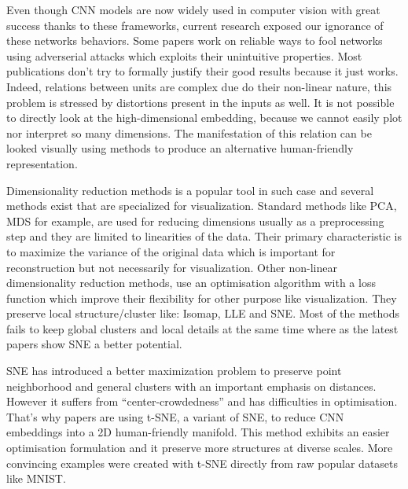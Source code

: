 \documentclass[a4paper,12pt]{report}
\begin{document}
Even though CNN models are now widely used in computer vision with great success thanks to these frameworks, current research exposed our ignorance of these networks behaviors.
Some papers work on reliable ways to fool networks using adverserial attacks which exploits their unintuitive properties\cite{szegedy2013intriguing}.
Most publications don't try to formally justify their good results because it just works. %
Indeed, relations between units are complex due do their non-linear nature, this problem is stressed by distortions present in the inputs as well.
It is not possible to directly look at the high-dimensional embedding, because we cannot easily plot nor interpret so many dimensions.
The manifestation of this relation can be looked visually using methods to produce an alternative human-friendly representation.

Dimensionality reduction methods is a popular tool in such case\cite{dai2014document}\cite{taylor2011learning} and several methods exist that are specialized for visualization.
Standard methods like PCA, MDS\cite{cox2000multidimensional} for example, are used for reducing dimensions usually as a preprocessing step and they are limited to linearities of the data.
Their primary characteristic is to maximize the variance of the original data which is important for reconstruction but not necessarily for visualization.
Other non-linear dimensionality reduction methods, use an optimisation algorithm with a loss function which improve their flexibility for other purpose like visualization.
They preserve local structure/cluster like: Isomap\cite{tenenbaum2000global}, LLE\cite{roweis2000nonlinear} and SNE\cite{SNE}.
Most of the methods fails to keep global clusters and local details at the same time where as the latest papers show SNE a better potential\cite{SNE}.

SNE has introduced a better maximization problem to preserve point neighborhood and general clusters with an important emphasis on distances\cite{SNE}.
However it suffers from ``center-crowdedness'' and has difficulties in optimisation\cite{t-SNE}.
That's why papers are using t-SNE, a variant of SNE, to reduce CNN embeddings into a 2D human-friendly manifold. %
This method exhibits an easier optimisation formulation and it preserve more structures at diverse scales.
More convincing examples were created with t-SNE directly from raw popular datasets\cite{van2009new} like MNIST\cite{t-SNE}.
\end{document}
